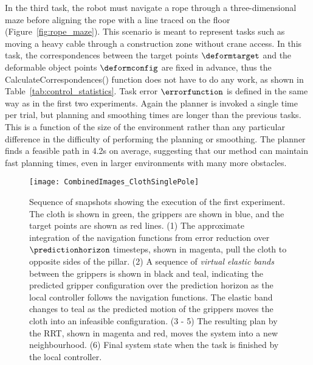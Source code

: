 In the third task, the robot must navigate a rope through a three-dimensional maze before aligning the rope with a line traced on the floor (Figure~\ref{fig:rope_maze}). This scenario is meant to represent tasks such as moving a heavy cable through a construction zone without crane access. In this task, the correspondences between the target points $\deformtarget$ and the deformable object points $\deformconfig$ are fixed in advance, thus the CalculateCorrespondences() function does not have to do any work, as shown in Table~\ref{tab:control_statistics}. Task error $\errorfunction$ is defined in the same way as in the first two experiments. Again the planner is invoked a single time per trial, but planning and smoothing times are longer than the previous tasks. This is a function of the size of the environment rather than any particular difference in the difficulty of performing the planning or smoothing. The planner finds a feasible path in 4.2s on average, suggesting that our method can maintain fast planning times, even in larger environments with many more obstacles.




\begin{figure*}[t]
    \centering
    \texttt{[image: CombinedImages\_ClothSinglePole]}
    \vspace{-0.2in}
    \caption{Sequence of snapshots showing the execution of the first experiment. The cloth is shown in green, the grippers are shown in blue, and the target points are shown as red lines. (1) The approximate integration of the navigation functions from error reduction over $\predictionhorizon$ timesteps, shown in magenta, pull the cloth to opposite sides of the pillar. (2) A sequence of \textit{virtual elastic bands} between the grippers is shown in black and teal, indicating the predicted gripper configuration over the prediction horizon as the local controller follows the navigation functions. The elastic band changes to teal as the predicted motion of the grippers moves the cloth into an infeasible configuration. (3 - 5) The resulting plan by the RRT, shown in magenta and red, moves the system into a new neighbourhood. (6) Final system state when the task is finished by the local controller.}
    \label{fig:cloth_single_pole}
\end{figure*}


